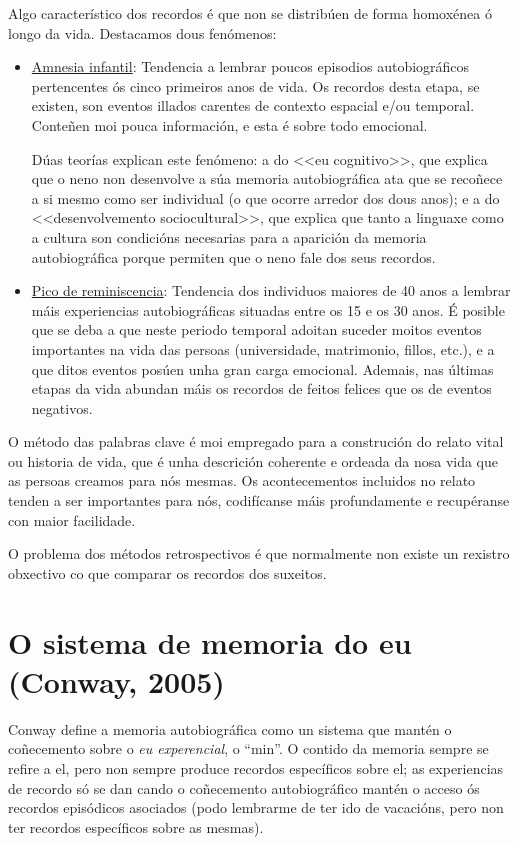 \documentclass[a4paper,11pt]{article}
\begin{document}
Algo característico dos recordos é que non se distribúen de forma homoxénea ó longo da vida. Destacamos dous fenómenos:
\begin{itemize}
	\item \underline{Amnesia infantil}: Tendencia a lembrar poucos episodios autobiográficos
	pertencentes ós cinco primeiros anos de vida. Os recordos desta etapa, se existen, son eventos
	illados carentes de contexto espacial e/ou temporal. Conteñen moi pouca información, e esta é
	sobre todo emocional. 
	
	Dúas teorías explican este fenómeno: a do <<eu cognitivo>>, que explica que o neno non 
	desenvolve a súa memoria autobiográfica ata que se recoñece a si mesmo como ser individual (o 
	que ocorre arredor dos dous anos); e a do <<desenvolvemento sociocultural>>, que explica que 
	tanto a linguaxe como a cultura son condicións necesarias para a aparición da memoria 
	autobiográfica porque permiten que o neno fale dos seus recordos.
	
	\item \underline{Pico de reminiscencia}: Tendencia dos individuos maiores de 40 anos a lembrar
	máis experiencias autobiográficas situadas entre os 15 e os 30 anos. É posible que se deba a que
	neste periodo temporal adoitan suceder moitos eventos importantes na vida das persoas 
	(universidade, matrimonio, fillos, etc.), e a que ditos eventos posúen unha gran carga 
	emocional. Ademais, nas últimas etapas da vida abundan máis os recordos de feitos felices que os 
	de eventos negativos.
\end{itemize}

O método das palabras clave é moi empregado para a construción do relato vital ou historia de vida, que é unha descrición coherente e ordeada da nosa vida que as persoas creamos para nós mesmas. Os acontecementos incluidos no relato tenden a ser importantes para nós, codifícanse máis profundamente e recupéranse con maior facilidade.

O problema dos métodos retrospectivos é que normalmente non existe un rexistro obxectivo co que comparar os recordos dos suxeitos.

\section{O sistema de memoria do eu (Conway, 2005)}
Conway define a memoria autobiográfica como un sistema que mantén o coñecemento sobre o \textit{eu experencial}, o ``min''. O contido da memoria sempre se refire a el, pero non sempre produce recordos específicos sobre el; as experiencias de recordo só se dan cando o coñecemento autobiográfico mantén o acceso ós recordos episódicos asociados (podo lembrarme de ter ido de vacacións, pero non ter recordos específicos sobre as mesmas).
\end{document}
